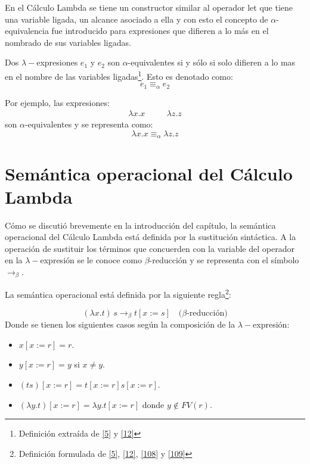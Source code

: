     En el Cálculo Lambda se tiene un constructor similar al operador \textsf{let} que tiene una variable ligada, un alcance asociado a ella y con esto el concepto de $\alpha$-equivalencia fue introducido para expresiones que difieren a lo más en el nombrado de sus variables ligadas. 
    \begin{definition}  Dos $\lambda-$expresiones $e_1$ y $e_2$ son $\alpha$-equivalentes si y sólo si solo difieren a lo mas en el nombre de las variables ligadas\footnote{Definición extraída de  \hyperlink{5}{[5]}  y  \hyperlink{12}{[12]}}. Esto es denotado como: $$e_1 \equiv_{\alpha} e_2 $$

     Por ejemplo, las expresiones:
    \[
        \begin{array}{ccc}
        \lambda x.x &\quad& \lambda z.z
        \end{array}
    \]
    \noindent
    son $\alpha$-equivalentes y se representa como: $$\lambda x.x\equiv_{\alpha}\lambda z.z$$
    \end{definition}


    \section{Semántica operacional del Cálculo Lambda}
    Cómo se discutió brevemente en la introducción del capítulo, la semántica operacional del Cálculo Lambda está definida por la sustitución sintáctica. 
A la operación de sustituir los términos que concuerden con la variable del operador en la $\lambda-$expresión se le conoce como $\beta$-reducción y se representa con el símbolo $\to_\beta$. 


    \begin{definition} La semántica operacional está definida por la siguiente regla\footnote{Definición formulada de \hyperlink{5}{[5]},  \hyperlink{12}{[12]},  \hyperlink{108}{[108]} y  \hyperlink{109}{[109]}}: 

    $$(\lambda x.t)\,s \to_\beta t[x:=s] \quad \text{($\beta$-reducción)}$$
    Donde se tienen los siguientes casos según la composición de la $\lambda-$expresión:\\
        \begin{itemize}
        \item $x[x:=r] = r$. 
        \item $y[x:=r] = y$ si $x\neq y$.
        \item $(ts)[x:=r] = t[x:=r]s[x:=r]$.
        \item $(\lambda y.t)[x:=r] = \lambda y.t[x:=r]$ donde $y\notin FV(r)$.
        \end{itemize}
	\bigskip
    \end{definition}

